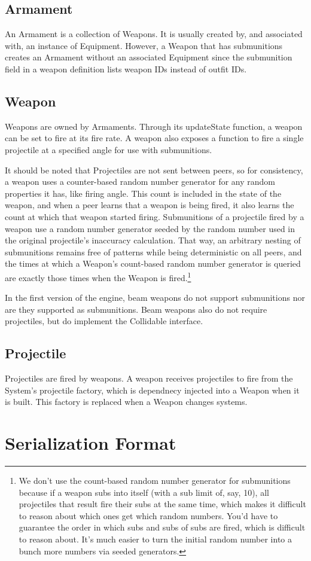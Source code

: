 \documentclass{article}
\begin{document}
\subsection{Armament}
An Armament is a collection of Weapons. It is usually created by, and associated with, an instance of Equipment. However, a Weapon that has submunitions creates an Armament without an associated Equipment since the submunition field in a weapon definition lists weapon IDs instead of outfit IDs.

\subsection{Weapon}
Weapons are owned by Armaments. Through its updateState function, a weapon can be set to fire at its fire rate. A weapon also exposes a function to fire a single projectile at a specified angle for use with submunitions.

It should be noted that Projectiles are not sent between peers, so for consistency, a weapon uses a counter-based random number generator for any random properties it has, like firing angle. This count is included in the state of the weapon, and when a peer learns that a weapon is being fired, it also learns the count at which that weapon started firing. Submunitions of a projectile fired by a weapon use a random number generator seeded by the random number used in the original projectile's inaccuracy calculation. That way, an arbitrary nesting of submunitions remains free of patterns while being deterministic on all peers, and the times at which a Weapon's count-based random number generator is queried are exactly those times when the Weapon is fired.\footnote{We don't use the count-based random number generator for submunitions because if a weapon subs into itself (with a sub limit of, say, 10), all projectiles that result fire their subs at the same time, which makes it difficult to reason about which ones get which random numbers. You'd have to guarantee the order in which subs and subs of subs are fired, which is difficult to reason about. It's much easier to turn the initial random number into a bunch more numbers via seeded generators.}

In the first version of the engine, beam weapons do not support submunitions nor are they supported as submunitions. Beam weapons also do not require projectiles, but do implement the Collidable interface.

\subsection{Projectile}
Projectiles are fired by weapons. A weapon receives projectiles to fire from the System's projectile factory, which is dependnecy injected into a Weapon when it is built. This factory is replaced when a Weapon changes systems.
\section{Serialization Format}
\end{document}
